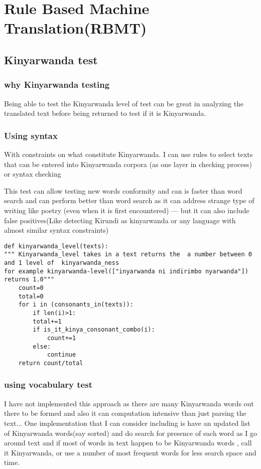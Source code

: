 \documentclass[10pt,a4paper]{article}
\begin{document}
\section{Rule Based Machine Translation(RBMT)}
\subsection{Kinyarwanda test}
\subsubsection{why Kinyarwanda testing}
Being able to test the Kinyarwanda level of test can be great in analyzing the translated text before being  returned to test if it is Kinyarwanda. 


\subsubsection{Using syntax}
With constraints on what constitute Kinyarwanda. I can use rules to select texts that can be entered into Kinyarwanda corpora (as one layer in checking process) or syntax checking

This test can allow testing new words conformity and can is faster than word search and can perform better than word search as it can address strange type of writing like poetry (even when it is first encountered)  --- but it can also include false positives(Like detecting Kirundi as kinyarwanda or any language with almost similar syntax constraints)
\begin{verbatim}
def kinyarwanda_level(texts):
"""	Kinyarwanda_level takes in a text returns the  a number between 0 and 1 level of  kinyarwanda_ness  
for example kinyarwanda-level(["inyarwanda ni indirimbo nyarwanda"]) returns 1.0"""
	count=0
	total=0
	for i in (consonants_in(texts)):
		if len(i)>1:
		total+=1
		if is_it_kinya_consonant_combo(i):
			count+=1
		else:
			continue
	return count/total 

\end{verbatim}


\subsubsection{using vocabulary test}
I have not implemented this approach as there are many Kinyarwanda words out there to be formed and also it can computation intensive than just parsing the text... One implementation that I can consider including is have an updated list of Kinyarwanda words(say sorted) and do search for presence of each word as I go around text and if most of words in text happen to be Kinyarwanda words , call it Kinyarwanda,  or use a number of most frequent words for less search space and time.
\end{document}
